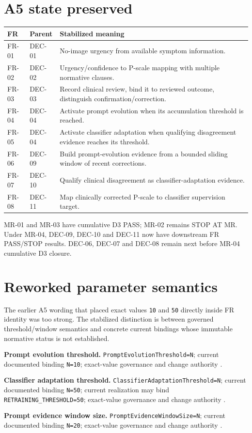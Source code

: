 \documentclass[11pt,a4paper]{article}
\begin{document}
\section{A5 state preserved}
\begin{tabularx}{\textwidth}{L{18mm}L{43mm}Y}\toprule
\textbf{FR} & \textbf{Parent} & \textbf{Stabilized meaning}\\\midrule
FR-01 & DEC-01 & No-image urgency from available symptom information.\\
FR-02 & DEC-02 & Urgency/confidence to P-scale mapping with multiple normative clauses.\\
FR-03 & DEC-03 & Record clinical review, bind it to reviewed outcome, distinguish confirmation/correction.\\
FR-04 & DEC-04 & Activate prompt evolution when its accumulation threshold is reached.\\
FR-05 & DEC-04 & Activate classifier adaptation when qualifying disagreement evidence reaches its threshold.\\
FR-06 & DEC-09 & Build prompt-evolution evidence from a bounded sliding window of recent corrections.\\
FR-07 & DEC-10 & Qualify clinical disagreement as classifier-adaptation evidence.\\
FR-08 & DEC-11 & Map clinically corrected P-scale to classifier supervision target.\\
\bottomrule\end{tabularx}

\begin{ddtacore}[title={Current A5 frontier}]
MR-01 and MR-03 have cumulative D3 PASS; MR-02 remains STOP AT MR. Under MR-04, DEC-09, DEC-10 and DEC-11 now have downstream FR PASS/STOP results. DEC-06, DEC-07 and DEC-08 remain next before MR-04 cumulative D3 closure.
\end{ddtacore}

\section{Reworked parameter semantics}
The earlier A5 wording that placed exact values \texttt{10} and \texttt{50} directly inside FR identity was too strong. The stabilized distinction is between governed threshold/window semantics and concrete current bindings whose immutable normative status is not established.

\begin{ddtaexample}[title={Semantic parameters and current bindings}]
\textbf{Prompt evolution threshold.} \texttt{PromptEvolutionThreshold=N}; current documented binding \texttt{N=10}; exact-value governance and change authority \NS.\par
\textbf{Classifier adaptation threshold.} \texttt{ClassifierAdaptationThreshold=N}; current documented binding \texttt{N=50}; current realization may bind \texttt{RETRAINING\_THRESHOLD=50}; exact-value governance and change authority \NS.\par
\textbf{Prompt evidence window size.} \texttt{PromptEvidenceWindowSize=N}; current documented binding \texttt{N=20}; exact-value governance and change authority \NS.
\end{ddtaexample}
\end{document}
